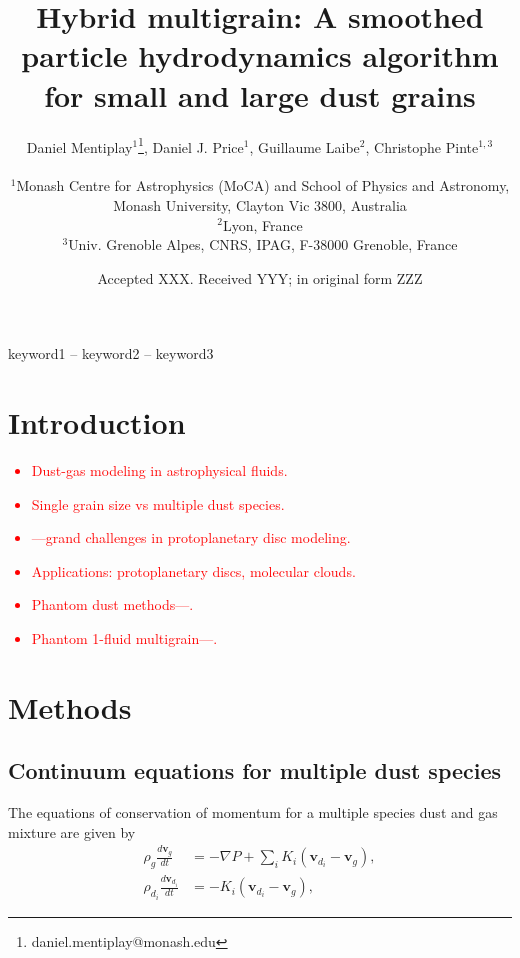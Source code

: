 \documentclass[fleqn,usenatbib]{mnras}
\title[Hybrid multigrain]{Hybrid multigrain: A smoothed particle hydrodynamics
algorithm for small and large dust grains}
\author[Mentiplay, Price, Laibe, \& Pinte]{%
   \parbox{\textwidth}{%
      Daniel Mentiplay\(^{1}\)\thanks{daniel.mentiplay@monash.edu},
      Daniel J. Price\(^{1}\),
      Guillaume Laibe\(^{2}\),
      Christophe Pinte\(^{1,3}\)}\\
   \(^{1}\)Monash Centre for Astrophysics (MoCA) and School of Physics and
   Astronomy, Monash University, Clayton Vic 3800, Australia \\
   \(^{2}\)Lyon, France \\
   \(^{3}\)Univ. Grenoble Alpes, CNRS, IPAG, F-38000 Grenoble, France}
\date{Accepted XXX. Received YYY; in original form ZZZ}
\let\vec\mathbf
\begin{document}
\label{firstpage}
\pagerange{\pageref{firstpage}--\pageref{lastpage}}
\maketitle

\begin{abstract}
\end{abstract}

\begin{keywords}
keyword1 -- keyword2 -- keyword3
\end{keywords}



\section{Introduction}

\textcolor{red}{
\begin{itemize}
   \item Dust-gas modeling in astrophysical fluids.
   \item Single grain size vs multiple dust species.
   \item \citet{Haworth2016PASA...33...53H}---grand challenges in protoplanetary disc
      modeling.
   \item Applications: protoplanetary discs, molecular clouds.
   \item Phantom dust methods---\citet{Price2018PASA...35...31P}.
   \item Phantom 1-fluid multigrain---\citet{Hutchison2018MNRAS.476.2186H}.
\end{itemize}
}

\section{Methods}

\subsection{Continuum equations for multiple dust species}

The equations of conservation of momentum for a multiple species dust and gas
mixture are given by
%
\begin{align}
   \rho_g \frac{d \vec{v}_g}{dt} &= - \nabla P + \sum_i K_i \left(\vec{v}_{d_i}
                                    - \vec{v}_{g}\right), \\
   \rho_{d_i} \frac{d \vec{v}_{d_i}}{dt} &= - K_i \left(\vec{v}_{d_i}
                                                       - \vec{v}_{g}\right),
\end{align}
%
\end{document}
